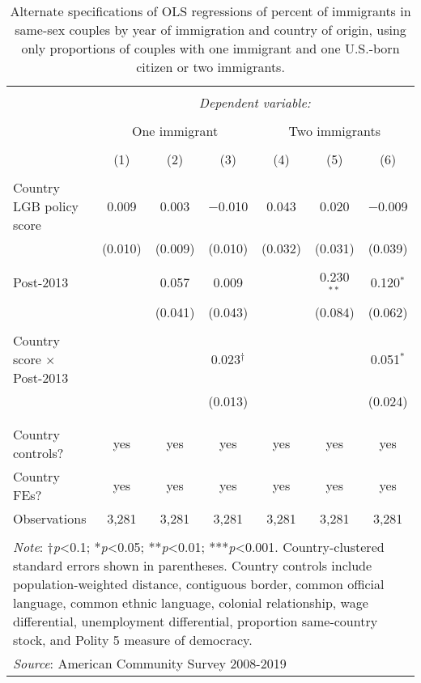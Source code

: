 \documentclass[
  11pt,
]{article}
\begin{document}
\begin{table}[H] \centering 
  \caption{Alternate specifications of OLS regressions of percent of immigrants in same-sex couples by year of immigration and country of origin, using only proportions of couples with one immigrant and one U.S.-born citizen or two immigrants.} 
  \label{tab:country-props-alt2} 
\begin{tabular}{@{\extracolsep{5pt}}lcccccc} 
\\[-1.8ex]\hline 
\hline \\[-1.8ex] 
 & \multicolumn{6}{c}{\textit{Dependent variable:}} \\ 
\cline{2-7} 
\\[-1.8ex] & \multicolumn{3}{c}{One immigrant} & \multicolumn{3}{c}{Two immigrants} \\ 
\\[-1.8ex] & (1) & (2) & (3) & (4) & (5) & (6)\\ 
\hline \\[-1.8ex] 
 Country LGB policy score & 0.009 & 0.003 & $-$0.010 & 0.043 & 0.020 & $-$0.009 \\ 
  & (0.010) & (0.009) & (0.010) & (0.032) & (0.031) & (0.039) \\ 
  & & & & & & \\ 
 Post-2013 &  & 0.057 & 0.009 &  & 0.230$^{**}$ & 0.120$^{*}$ \\ 
  &  & (0.041) & (0.043) &  & (0.084) & (0.062) \\ 
  & & & & & & \\ 
 Country score × Post-2013 &  &  & 0.023$^{†}$ &  &  & 0.051$^{*}$ \\ 
  &  &  & (0.013) &  &  & (0.024) \\ 
  & & & & & & \\ 
\hline \\[-1.8ex] 
Country controls? & yes & yes & yes & yes & yes & yes \\ 
Country FEs? & yes & yes & yes & yes & yes & yes \\ 
Observations & 3,281 & 3,281 & 3,281 & 3,281 & 3,281 & 3,281 \\ 
\hline 
\hline \\[-1.8ex] 
\multicolumn{7}{l}{\parbox[t]{\textwidth}{\textit{Note}: †\textit{p}<0.1; *\textit{p}<0.05; **\textit{p}<0.01; ***\textit{p}<0.001. Country-clustered standard errors shown in parentheses. Country controls include population-weighted distance, contiguous border, common official language, common ethnic language, colonial relationship, wage differential, unemployment differential, proportion same-country stock, and Polity 5 measure of democracy.}} \\ 
\multicolumn{7}{l}{\textit{Source}: American Community Survey 2008-2019} \\ 
\end{tabular} 
\end{table}
\end{document}
